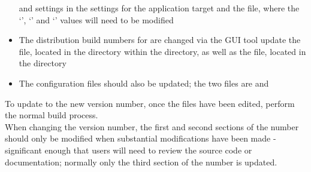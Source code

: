 \begin{itemize}
 and  settings in the  settings for the
application target \longDash{} and the  file, where the
`', `' and `' values will
need to be modified
\item\exSp{}The distribution build numbers for \mac{} are changed via the
 GUI tool \longDash{} update the  file, located in the
 directory within the 
directory, as well as the  file, located in the
 directory
\item\exSp{}The  configuration files should also be updated; the two
files are  and
\end{itemize}
To update to the new version number, once the files have been edited, perform the normal
build process.\\

When changing the version number, the first and second sections of the number should only
be modified when substantial modifications have been made - significant enough that users
will need to review the source code or documentation; normally only the third section of
the number is updated.
\appendixEnd{}




